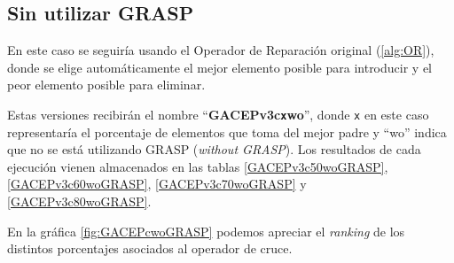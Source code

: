 \subsection{Sin utilizar GRASP}

En este caso se seguiría usando el Operador de Reparación original (\ref{alg:OR}), donde se elige automáticamente el mejor elemento posible para introducir y el peor elemento posible para eliminar.

Estas versiones recibirán el nombre ``\textbf{GACEPv3c\texttt{x}wo}'', donde \texttt{x} en este caso representaría el porcentaje de elementos que toma del mejor padre y ``wo'' indica que no se está utilizando GRASP (\textit{without GRASP}). 
Los resultados de cada ejecución vienen almacenados en las tablas \ref{GACEPv3c50woGRASP}, \ref{GACEPv3c60woGRASP}, \ref{GACEPv3c70woGRASP} y \ref{GACEPv3c80woGRASP}.

En la gráfica \ref{fig:GACEPcwoGRASP} podemos apreciar el \textit{ranking} de los distintos porcentajes asociados al operador de cruce.

